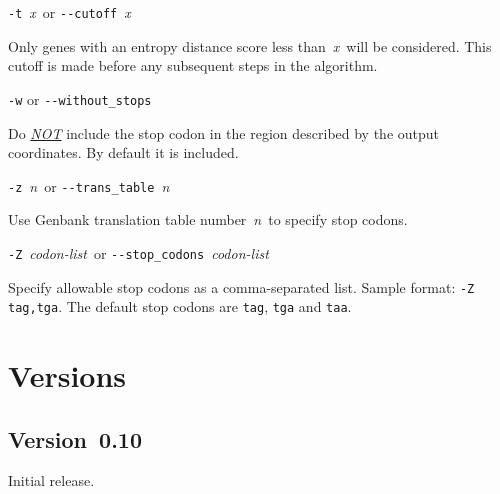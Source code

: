 \documentclass[fleqn,titlepage,11pt]{article}
\def\Desc#1{\,\mbox{\emph{#1}}\,}
\def\Pg#1{\texttt{#1}}
\begin{document}
\exdent
  \verb`-t` \Desc{x} \enskip or \enskip \verb`--cutoff` \Desc{x}

  Only genes with an entropy distance score less than \Desc{x} will
  be considered.  This cutoff is made before any subsequent steps
  in the algorithm.

\exdent
  \verb`-w` \enskip or \enskip \verb`--without_stops`

  Do \underline{\emph{NOT}} include the stop codon in the region
  described by the output coordinates.  By default it is included.

\exdent
  \verb`-z` \Desc{n} \enskip or \enskip \verb`--trans_table` \Desc{n}

  Use Genbank translation table number \Desc{n} to specify stop codons.

\exdent
  \verb`-Z` \Desc{codon-list} \enskip or \enskip \verb`--stop_codons` \Desc{codon-list}

  Specify allowable stop codons as a comma-separated list.
  Sample format:  \verb`-Z tag,tga`.
  The default stop codons are \Pg{tag}, \Pg{tga} and \Pg{taa}.
\el

\section{Versions}

\subsection{Version~0.10}
  \bi\RaggedRight
  \item    
    Initial release.
  \ei

\raggedright


\end{document}
